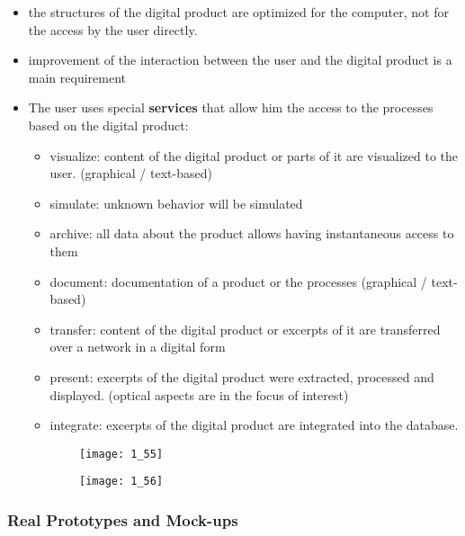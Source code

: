 \documentclass{standalone}
\begin{document}
\begin{itemize}
	\item the structures of the digital product are optimized for the computer, not for the access by the user directly. 
	\item improvement of the interaction between the user and the digital product is a main requirement
	\item The user uses special \textbf{services} that allow him the access to the processes based on the digital product:
		\begin{itemize}
			\item visualize: content of the digital product or parts of it are visualized to the user. (graphical / text-based)
			\item simulate: unknown behavior will be simulated
			\item archive: all data about the product allows having instantaneous access to them
			\item document: documentation of a product or the processes (graphical / text-based)
			\item transfer: content of the digital product or excerpts of it are transferred over a network in a digital form
			\item present: excerpts of the digital product were extracted, processed and displayed. (optical aspects are in the focus of interest)
			\item integrate: excerpts of the digital product are integrated into the database. 
		\end{itemize}
\end{itemize}

\begin{figure}[H]
	\centering
	\begin{subfigure}[b]{0.45\textwidth}	
		\texttt{[image: 1\_55]}
	\end{subfigure}
	\begin{subfigure}[b]{0.45\textwidth}	
		\texttt{[image: 1\_56]}
	\end{subfigure}
\end{figure}


\subsubsection*{Real Prototypes and Mock-ups}
\end{document}
